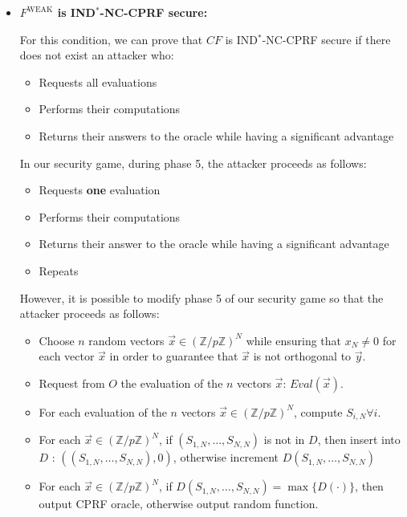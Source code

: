 \documentclass[9pt]{extarticle}
\begin{document}
\begin{itemize}
We say that $P$ is non-programmable if $P.Prog$ does not update $\sigma_P$ and the execution of $P.Ls$ on different inputs does not change the distribution of its output.

In our implementation of $F^{\text{WEAK}}$, we use lazy sampling to implement the hash function $H$. This implies that $Eval_H(\vec{x}) = H(S \cdot \vec{x})$ is fixed only when the evaluation of $\vec{x}$ is requested, but not earlier.

We can therefore conclude that $P$ is non-programmable.

\item \textbf{$F^{\text{WEAK}}$ is IND$^*$-NC-CPRF secure:}

For this condition, we can prove that $CF$ is IND$^*$-NC-CPRF secure if there does not exist an attacker who:

\begin{itemize}
  \item Requests all evaluations
  \item Performs their computations
  \item Returns their answers to the oracle while having a significant advantage
\end{itemize}

In our security game, during phase 5, the attacker proceeds as follows: 

\begin{itemize}
  \item Requests \textbf{one} evaluation
  \item Performs their computations
  \item Returns their answer to the oracle while having a significant advantage
  \item Repeats
\end{itemize}

However, it is possible to modify phase 5 of our security game so that the attacker proceeds as follows: 

\begin{itemize}
  \item Choose $n$ random vectors $\vec{x} \in (\mathbb{Z}/p\mathbb{Z})^N$ while ensuring that $x_N \neq 0$ for each vector $\vec{x}$ in order to guarantee that $\vec{x}$ is not orthogonal to $\vec{y}$.
  \item Request from $O$ the evaluation of the $n$ vectors $\vec{x}$: $Eval(\vec{x})$.
  \item For each evaluation of the $n$ vectors $\vec{x} \in (\mathbb{Z}/p\mathbb{Z})^N$, compute $S_{i,N} \forall i$.
  \item For each $\vec{x} \in (\mathbb{Z}/p\mathbb{Z})^N$, if $(S_{1,N},\ldots,S_{N,N})$ is not in $D$, then insert into $D$ : $( (S_{1,N},\ldots,S_{N,N}), 0)$, otherwise increment $D(S_{1,N},\ldots,S_{N,N})$
  \item For each $\vec{x} \in (\mathbb{Z}/p\mathbb{Z})^N$, if $D(S_{1,N},\ldots,S_{N,N}) = \max\{D(\cdot)\}$, then output CPRF oracle, otherwise output random function.
\end{itemize}


\end{itemize}
\end{document}
